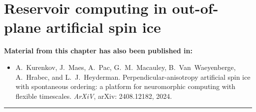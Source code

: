 \chapter{Reservoir computing in out-of-plane artificial spin ice}\label{ch:Applications}

\begin{adjustwidth}{2em}{2em} %
	\begin{center}
		\textbf{Material from this chapter has also been published in:} \\
	\end{center}
	\vspace{1em}
	\begin{adjustwidth}{0em}{1.5em}
		\begin{itemize}
			\item[\cite{KUR-24}] A.~Kurenkov, J.~Maes, A.~Pac, G.~M.~Macauley, B.~Van~Waeyenberge, A.~Hrabec, and L.~J.~Heyderman.
			\newblock Perpendicular-anisotropy artificial spin ice with spontaneous ordering: a platform for neuromorphic computing with flexible timescales.
			\newblock \emph{ArXiV}, arXiv: 2408.12182, 2024.
		\end{itemize}
	\end{adjustwidth}
	\vspace{.5em}
	\begin{center}
		\centering\rule{0.7\linewidth}{0.4pt}
	\end{center}
	\vspace{1em}
\end{adjustwidth}


